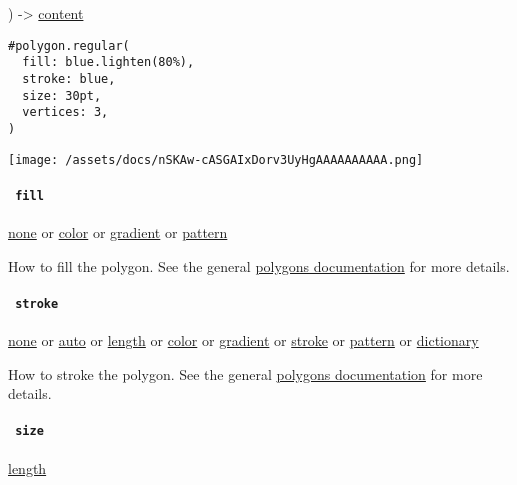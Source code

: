 ) -\textgreater{} \href{/docs/reference/foundations/content/}{content}

\begin{verbatim}
#polygon.regular(
  fill: blue.lighten(80%),
  stroke: blue,
  size: 30pt,
  vertices: 3,
)
\end{verbatim}

\texttt{[image: /assets/docs/nSKAw-cASGAIxDorv3UyHgAAAAAAAAAA.png]}

\paragraph{\texorpdfstring{\texttt{\ fill\ }}{ fill }}\label{definitions-regular-fill}

\href{/docs/reference/foundations/none/}{none} {or}
\href{/docs/reference/visualize/color/}{color} {or}
\href{/docs/reference/visualize/gradient/}{gradient} {or}
\href{/docs/reference/visualize/pattern/}{pattern}

How to fill the polygon. See the general
\href{/docs/reference/visualize/polygon/\#parameters-fill}{polygon\textquotesingle s
documentation} for more details.

\paragraph{\texorpdfstring{\texttt{\ stroke\ }}{ stroke }}\label{definitions-regular-stroke}

\href{/docs/reference/foundations/none/}{none} {or}
\href{/docs/reference/foundations/auto/}{auto} {or}
\href{/docs/reference/layout/length/}{length} {or}
\href{/docs/reference/visualize/color/}{color} {or}
\href{/docs/reference/visualize/gradient/}{gradient} {or}
\href{/docs/reference/visualize/stroke/}{stroke} {or}
\href{/docs/reference/visualize/pattern/}{pattern} {or}
\href{/docs/reference/foundations/dictionary/}{dictionary}

How to stroke the polygon. See the general
\href{/docs/reference/visualize/polygon/\#parameters-stroke}{polygon\textquotesingle s
documentation} for more details.

\paragraph{\texorpdfstring{\texttt{\ size\ }}{ size }}\label{definitions-regular-size}

\href{/docs/reference/layout/length/}{length}

